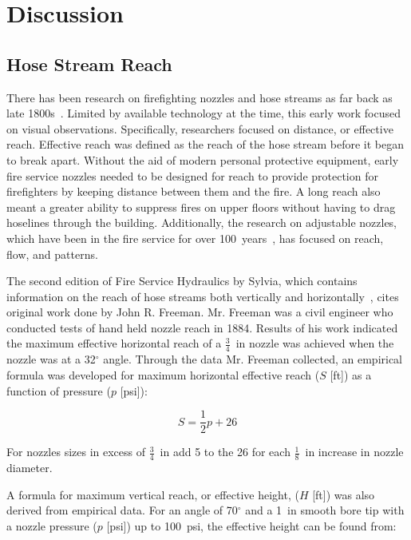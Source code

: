 \documentclass[12pt,oneside]{book}
\begin{document}
\chapter{Discussion}

\section{Hose Stream Reach}
\label{sec:hose_reach}
There has been research on firefighting nozzles and hose streams as far back as late 1800s~\cite{CHICAGO_TRIBUNE:1339:a}. Limited by available technology at the time, this early work focused on visual observations. Specifically, researchers focused on distance, or effective reach. Effective reach was defined as the reach of the hose stream before it began to break apart. Without the aid of modern personal protective equipment, early fire service nozzles needed to be designed for reach to provide protection for firefighters by keeping distance between them and the fire. A long reach also meant a greater ability to suppress fires on upper floors without having to drag hoselines through the building. Additionally, the research on adjustable nozzles, which have been in the fire service for over 100~years~\cite{PALMER:1878}, has focused on reach, flow, and patterns. 

The second edition of Fire Service Hydraulics by Sylvia, which contains information on the reach of hose streams both vertically and horizontally~\cite{SYLVIA:1970}, cites original work done by John R. Freeman. Mr. Freeman was a civil engineer who conducted tests of hand held nozzle reach in 1884. Results of his work indicated the maximum effective horizontal reach of a $\frac{3}{4}$~in nozzle was achieved when the nozzle was at a 32$^\circ$ angle. Through the data Mr. Freeman collected, an empirical formula was developed for maximum horizontal effective reach ($S$ [ft]) as a function of pressure ($p$ [psi]): 

\begin{equation*}
	S = \frac{1}{2}p+26
\end{equation*}

For nozzles sizes in excess of $\frac{3}{4}$~in add 5 to the 26 for each $\frac{1}{8}$~in increase in nozzle diameter. 

A formula for maximum vertical reach, or effective height, ($H$ [ft]) was also derived from empirical data. For an angle of 70$^{\circ}$ and a 1~in smooth bore tip with a nozzle pressure ($p$ [psi]) up to 100~psi, the effective height can be found from:
\end{document}
